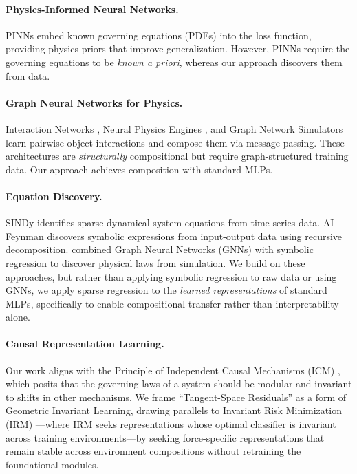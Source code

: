 \documentclass[twoside,11pt]{article}
\begin{document}
\paragraph{Physics-Informed Neural Networks.}
PINNs \citep{raissi2019pinns} embed known governing equations (PDEs) into the loss function, providing physics priors that improve generalization. However, PINNs require the governing equations to be \emph{known a priori}, whereas our approach discovers them from data.

\paragraph{Graph Neural Networks for Physics.}
Interaction Networks \citep{battaglia2016interaction}, Neural Physics Engines \citep{chang2017npe}, and Graph Network Simulators \citep{sanchez2020gns} learn pairwise object interactions and compose them via message passing. These architectures are \emph{structurally} compositional but require graph-structured training data. Our approach achieves composition with standard MLPs.

\paragraph{Equation Discovery.}
SINDy \citep{brunton2016sindy} identifies sparse dynamical system equations from time-series data. AI Feynman \citep{udrescu2020aifeynman} discovers symbolic expressions from input-output data using recursive decomposition. \citet{cranmer2020discovering} combined Graph Neural Networks (GNNs) with symbolic regression to discover physical laws from simulation. We build on these approaches, but rather than applying symbolic regression to raw data or using GNNs, we apply sparse regression to the \emph{learned representations} of standard MLPs, specifically to enable compositional transfer rather than interpretability alone.

\paragraph{Causal Representation Learning.}
Our work aligns with the Principle of Independent Causal Mechanisms (ICM) \citep{scholkopf2021toward}, which posits that the governing laws of a system should be modular and invariant to shifts in other mechanisms. We frame ``Tangent-Space Residuals'' as a form of Geometric Invariant Learning, drawing parallels to Invariant Risk Minimization (IRM) \citep{arjovsky2019irm}---where IRM seeks representations whose optimal classifier is invariant across training environments---by seeking force-specific representations that remain stable across environment compositions without retraining the foundational modules.
\end{document}
